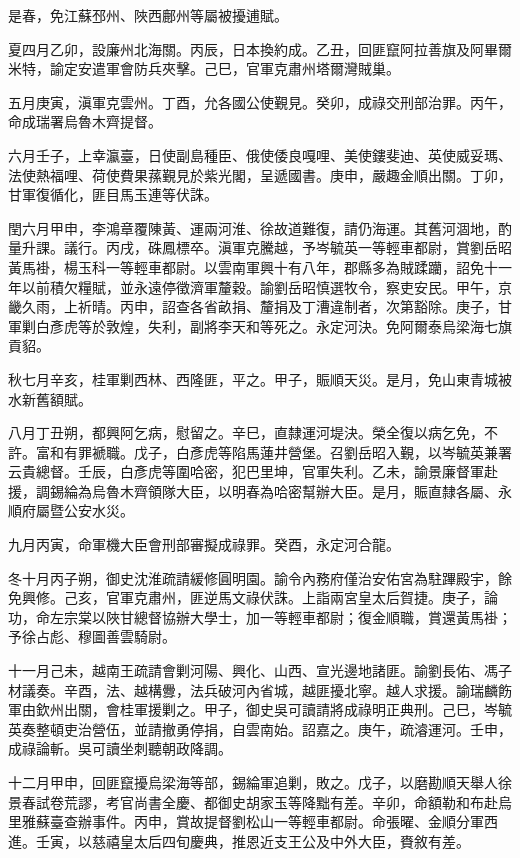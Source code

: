 \begin{pinyinscope}
是春，免江蘇邳州、陜西鄜州等屬被擾逋賦。

夏四月乙卯，設廉州北海關。丙辰，日本換約成。乙丑，回匪竄阿拉善旗及阿畢爾米特，諭定安遣軍會防兵夾擊。己巳，官軍克肅州塔爾灣賊巢。

五月庚寅，滇軍克雲州。丁酉，允各國公使覲見。癸卯，成祿交刑部治罪。丙午，命成瑞署烏魯木齊提督。

六月壬子，上幸瀛臺，日使副島種臣、俄使倭良嘎哩、美使鏤斐迪、英使威妥瑪、法使熱福哩、荷使費果蓀覲見於紫光閣，呈遞國書。庚申，嚴趣金順出關。丁卯，甘軍復循化，匪目馬玉連等伏誅。

閏六月甲申，李鴻章覆陳黃、運兩河淮、徐故道難復，請仍海運。其舊河涸地，酌量升課。議行。丙戌，硃鳳標卒。滇軍克騰越，予岑毓英一等輕車都尉，賞劉岳昭黃馬褂，楊玉科一等輕車都尉。以雲南軍興十有八年，郡縣多為賊蹂躪，詔免十一年以前積欠糧賦，並永遠停徵濟軍釐穀。諭劉岳昭慎選牧令，察吏安民。甲午，京畿久雨，上祈晴。丙申，詔查各省畝捐、釐捐及丁漕違制者，次第豁除。庚子，甘軍剿白彥虎等於敦煌，失利，副將李天和等死之。永定河決。免阿爾泰烏梁海七旗貢貂。

秋七月辛亥，桂軍剿西林、西隆匪，平之。甲子，賑順天災。是月，免山東青城被水新舊額賦。

八月丁丑朔，都興阿乞病，慰留之。辛巳，直隸運河堤決。榮全復以病乞免，不許。富和有罪褫職。戊子，白彥虎等陷馬蓮井營堡。召劉岳昭入覲，以岑毓英兼署云貴總督。壬辰，白彥虎等圍哈密，犯巴里坤，官軍失利。乙未，諭景廉督軍赴援，調錫綸為烏魯木齊領隊大臣，以明春為哈密幫辦大臣。是月，賑直隸各屬、永順府屬暨公安水災。

九月丙寅，命軍機大臣會刑部審擬成祿罪。癸酉，永定河合龍。

冬十月丙子朔，御史沈淮疏請緩修圓明園。諭令內務府僅治安佑宮為駐蹕殿宇，餘免興修。己亥，官軍克肅州，匪逆馬文祿伏誅。上詣兩宮皇太后賀捷。庚子，論功，命左宗棠以陜甘總督協辦大學士，加一等輕車都尉；復金順職，賞還黃馬褂；予徐占彪、穆圖善雲騎尉。

十一月己未，越南王疏請會剿河陽、興化、山西、宣光邊地諸匪。諭劉長佑、馮子材議奏。辛酉，法、越構釁，法兵破河內省城，越匪擾北寧。越人求援。諭瑞麟飭軍由欽州出關，會桂軍援剿之。甲子，御史吳可讀請將成祿明正典刑。己巳，岑毓英奏整頓吏治營伍，並請撤勇停捐，自雲南始。詔嘉之。庚午，疏濬運河。壬申，成祿論斬。吳可讀坐刺聽朝政降調。

十二月甲申，回匪竄擾烏梁海等部，錫綸軍追剿，敗之。戊子，以磨勘順天舉人徐景春試卷荒謬，考官尚書全慶、都御史胡家玉等降黜有差。辛卯，命額勒和布赴烏里雅蘇臺查辦事件。丙申，賞故提督劉松山一等輕車都尉。命張曜、金順分軍西進。壬寅，以慈禧皇太后四旬慶典，推恩近支王公及中外大臣，賚敘有差。


\end{pinyinscope}
